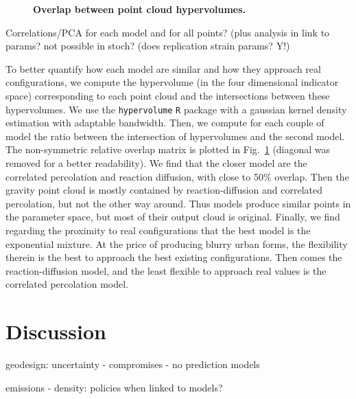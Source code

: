 \documentclass[10pt,letterpaper]{article}
\begin{document}
\begin{figure}[!h]
	\vspace{2cm}
	\caption{{\bf Overlap between point cloud hypervolumes.}\label{fig:fig5}}
\end{figure}


Correlations/PCA for each model and for all points? (plus analysis in link to params? not possible in stoch? (does replication strain params? Y!)


To better quantify how each model are similar and how they approach real configurations, we compute the hypervolume (in the four dimensional indicator space) corresponding to each point cloud and the intersections between these hypervolumes. We use the \texttt{hypervolume} \texttt{R} package \cite{hypervolume} with a gaussian kernel density estimation with adaptable bandwidth. Then, we compute for each couple of model the ratio between the intersection of hypervolumes and the second model. The non-symmetric relative overlap matrix is plotted in Fig.~\ref{fig:fig5} (diagonal was removed for a better readability). We find that the closer model are the correlated percolation and reaction diffusion, with close to 50\% overlap. Then the gravity point cloud is mostly contained by reaction-diffusion and correlated percolation, but not the other way around. Thus models produce similar points in the parameter space, but most of their output cloud is original. Finally, we find regarding the proximity to real configurations that the best model is the exponential mixture. At the price of producing blurry urban forms, the flexibility therein is the best to approach the best existing configurations. Then comes the reaction-diffusion model, and the least flexible to approach real values is the correlated percolation model.

\section*{Discussion}

geodesign: uncertainty - compromises - no prediction models

\cite{10.1371/journal.pone.0242479} emissions - density: policies when linked to models?

\cite{d2019new}


\end{document}
